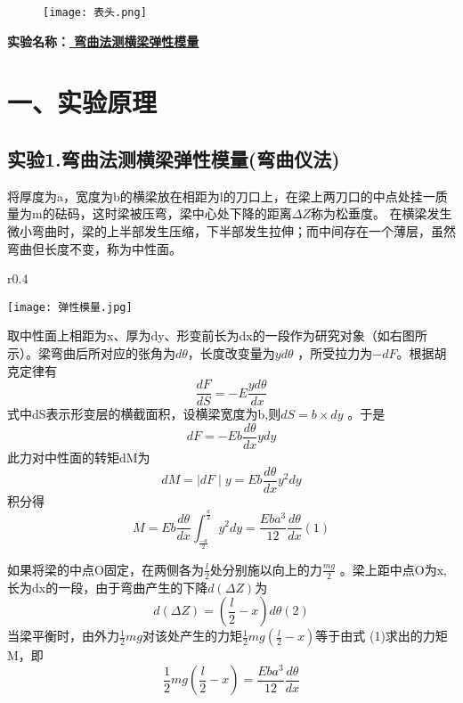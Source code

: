 \documentclass[11pt,a4paper,oneside]{article}
\begin{document}
\begin{figure}[H]
 \centering
  \texttt{[image: 表头.png]}
\end{figure}
\begin{center}
\textbf{{\large 实验名称：\uline{        弯曲法测横梁弹性模量       }}}
\end{center}

\section*{一、实验原理}
\subsection*{实验1.弯曲法测横梁弹性模量(弯曲仪法)}
将厚度为a，宽度为b的横梁放在相距为l的刀口上，在梁上两刀口的中点处挂一质量为m的砝码，这时梁被压弯，梁中心处下降的距离${\Delta}Z$称为松垂度。
在横梁发生微小弯曲时，梁的上半部发生压缩，下半部发生拉伸；而中间存在一个薄层，虽然弯曲但长度不变，称为中性面。

\begin{wrapfigure}{r}{0.4\textwidth}
  \vspace{-20pt}
  \begin{center}
    \texttt{[image: 弹性模量.jpg]}
  \end{center}
  \vspace{-20pt}
  \vspace{-10pt}
\end{wrapfigure}

取中性面上相距为x、厚为dy、形变前长为dx的一段作为研究对象（如右图所示）。梁弯曲后所对应的张角为$d{\theta}$，长度改变量为$yd{\theta}$ ，所受拉力为$-dF$。根据胡克定律有
$$\displaystyle\frac{dF}{dS} = -E {\displaystyle\frac{yd{\theta}}{dx}}$$
式中dS表示形变层的横截面积，设横梁宽度为b,则$dS=b{\times}dy$ 。于是
$$dF = -Eb {\displaystyle\frac{d{\theta}}{dx} ydy}$$
此力对中性面的转矩dM为
 $$dM = {\mid}dF{\mid}y = Eb {\displaystyle\frac{d{\theta}}{dx}} y^2dy$$
积分得 
$$M = Eb {\displaystyle\frac{d{\theta}}{dx}} {\int_{\frac{-a}{2}}^{\frac{a}{2}}}y^2dy = {\displaystyle\frac{Eba^3}{12}} {\displaystyle\frac{d{\theta}}{dx}} (1)$$

如果将梁的中点O固定，在两侧各为$\displaystyle\frac{l}{2}$处分别施以向上的力$\displaystyle\frac{mg}{2}$ 。梁上距中点O为x,长为dx的一段，由于弯曲产生的下降$d({\Delta}Z)$为
 $$d({\Delta}Z)=({\displaystyle\frac{l}{2}}-x) d{\theta} (2)$$
当梁平衡时，由外力$\displaystyle\frac{1}{2}mg$对该处产生的力矩$\displaystyle\frac{1}{2}mg({\displaystyle\frac{l}{2}}-x)$等于由式 (1)求出的力矩M，即
$${\displaystyle\frac{1}{2}mg}({\displaystyle\frac{l}{2}}-x) = {\displaystyle\frac{Eba^3}{12}} {\displaystyle\frac{d{\theta}}{dx}}$$
 
\end{document}
